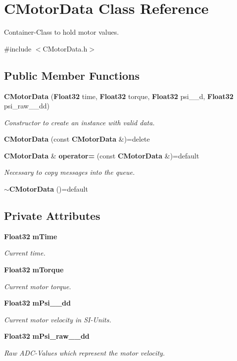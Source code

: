 \section{C\-Motor\-Data Class Reference}
\label{classCMotorData}


Container-\/\-Class to hold motor values.  




{\ttfamily \#include $<$C\-Motor\-Data.\-h$>$}

\subsection*{Public Member Functions}
\begin{DoxyCompactItemize}
\item 
{\bf C\-Motor\-Data} ({\bf Float32} time, {\bf Float32} torque, {\bf Float32} psi\-\_\-\-\_\-d, {\bf Float32} psi\-\_\-raw\-\_\-\-\_\-dd)
\begin{DoxyCompactList}\small\item\em Constructor to create an instance with valid data. \end{DoxyCompactList}\item 
{\bf C\-Motor\-Data} (const {\bf C\-Motor\-Data} \&)=delete
\item 
{\bf C\-Motor\-Data} \& {\bf operator=} (const {\bf C\-Motor\-Data} \&)=default
\begin{DoxyCompactList}\small\item\em Necessary to copy messages into the queue. \end{DoxyCompactList}\item 
{\bf $\sim$\-C\-Motor\-Data} ()=default
\end{DoxyCompactItemize}
\subsection*{Private Attributes}
\begin{DoxyCompactItemize}
\item 
{\bf Float32} {\bf m\-Time}
\begin{DoxyCompactList}\small\item\em Current time. \end{DoxyCompactList}\item 
{\bf Float32} {\bf m\-Torque}
\begin{DoxyCompactList}\small\item\em Current motor torque. \end{DoxyCompactList}\item 
{\bf Float32} {\bf m\-Psi\-\_\-\-\_\-dd}
\begin{DoxyCompactList}\small\item\em Current motor velocity in S\-I-\/\-Units. \end{DoxyCompactList}\item 
{\bf Float32} {\bf m\-Psi\-\_\-raw\-\_\-\-\_\-dd}
\begin{DoxyCompactList}\small\item\em Raw A\-D\-C-\/\-Values which represent the motor velocity. \end{DoxyCompactList}\end{DoxyCompactItemize}


